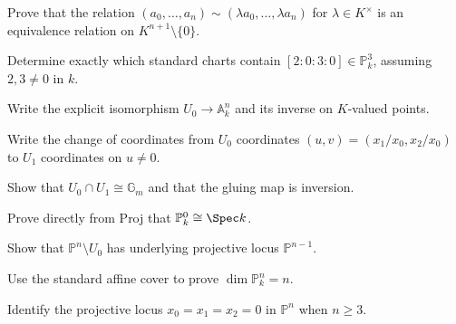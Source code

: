 \begin{exercise}\label{exr:vi36-01}
Prove that the relation \((a_0,\ldots,a_n)\sim(\lambda a_0,\ldots,\lambda a_n)\) for \(\lambda\in K^\times\) is an equivalence relation on \(K^{n+1}\setminus\{0\}\).
\end{exercise}

\begin{exercise}\label{exr:vi36-02}
Determine exactly which standard charts contain \([2:0:3:0]\in\mathbb P^3_k\), assuming \(2,3\ne0\) in \(k\).
\end{exercise}

\begin{exercise}\label{exr:vi36-03}
Write the explicit isomorphism \(U_0\to\mathbb A^n_k\) and its inverse on \(K\)-valued points.
\end{exercise}

\begin{exercise}\label{exr:vi36-04}
Write the change of coordinates from \(U_0\) coordinates \((u,v)=(x_1/x_0,x_2/x_0)\) to \(U_1\) coordinates on \(u\ne0\).
\end{exercise}

\begin{exercise}\label{exr:vi36-05}
Show that \(U_0\cap U_1\cong\mathbb G_m\) and that the gluing map is inversion.
\end{exercise}

\begin{exercise}\label{exr:vi36-06}
Prove directly from Proj that \(\mathbb P^0_k\cong\Spec k\).
\end{exercise}

\begin{exercise}\label{exr:vi36-07}
Show that \(\mathbb P^n\setminus U_0\) has underlying projective locus \(\mathbb P^{n-1}\).
\end{exercise}

\begin{exercise}[Dimension]\label{exr:vi36-08}
Use the standard affine cover to prove \(\dim\mathbb P^n_k=n\).
\end{exercise}

\begin{exercise}\label{exr:vi36-09}
Identify the projective locus \(x_0=x_1=x_2=0\) in \(\mathbb P^n\) when \(n\ge3\).
\end{exercise}

